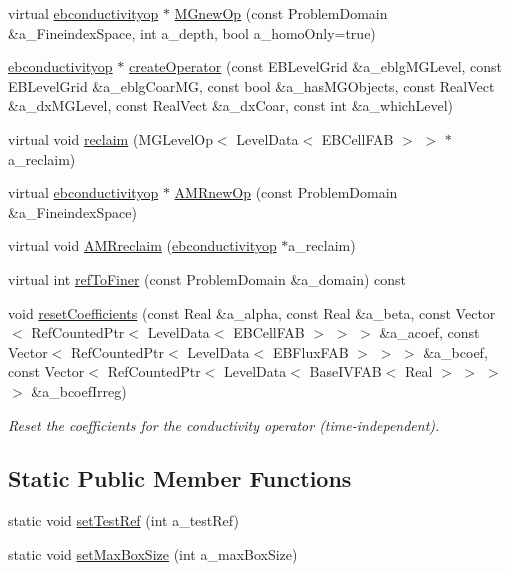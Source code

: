 \begin{DoxyCompactItemize}
\item 
virtual \hyperlink{classebconductivityop}{ebconductivityop} $\ast$ \hyperlink{classebconductivityopfactory_a2f87611c5524f4dd0ee6d693f125d33d}{M\+Gnew\+Op} (const Problem\+Domain \&a\+\_\+\+Fineindex\+Space, int a\+\_\+depth, bool a\+\_\+homo\+Only=true)
\item 
\hyperlink{classebconductivityop}{ebconductivityop} $\ast$ \hyperlink{classebconductivityopfactory_a705a3b0bbaa846e7ca7a199a016bf245}{create\+Operator} (const E\+B\+Level\+Grid \&a\+\_\+eblg\+M\+G\+Level, const E\+B\+Level\+Grid \&a\+\_\+eblg\+Coar\+MG, const bool \&a\+\_\+has\+M\+G\+Objects, const Real\+Vect \&a\+\_\+dx\+M\+G\+Level, const Real\+Vect \&a\+\_\+dx\+Coar, const int \&a\+\_\+which\+Level)
\item 
virtual void \hyperlink{classebconductivityopfactory_a0e98d91e4c39fdd82947a9ebffaea6f6}{reclaim} (M\+G\+Level\+Op$<$ Level\+Data$<$ E\+B\+Cell\+F\+AB $>$ $>$ $\ast$a\+\_\+reclaim)
\item 
virtual \hyperlink{classebconductivityop}{ebconductivityop} $\ast$ \hyperlink{classebconductivityopfactory_a2e7ceeb14a059d9f779ffe66a75c5b4e}{A\+M\+Rnew\+Op} (const Problem\+Domain \&a\+\_\+\+Fineindex\+Space)
\item 
virtual void \hyperlink{classebconductivityopfactory_a9a016c0b1c409d899d5d033aca0ab636}{A\+M\+Rreclaim} (\hyperlink{classebconductivityop}{ebconductivityop} $\ast$a\+\_\+reclaim)
\item 
virtual int \hyperlink{classebconductivityopfactory_a40a2eaf9ccf73ef1fa0c2570e43c181c}{ref\+To\+Finer} (const Problem\+Domain \&a\+\_\+domain) const 
\item 
void \hyperlink{classebconductivityopfactory_a3a4a129fc39c5c8bde6f48c469983864}{reset\+Coefficients} (const Real \&a\+\_\+alpha, const Real \&a\+\_\+beta, const Vector$<$ Ref\+Counted\+Ptr$<$ Level\+Data$<$ E\+B\+Cell\+F\+AB $>$ $>$ $>$ \&a\+\_\+acoef, const Vector$<$ Ref\+Counted\+Ptr$<$ Level\+Data$<$ E\+B\+Flux\+F\+AB $>$ $>$ $>$ \&a\+\_\+bcoef, const Vector$<$ Ref\+Counted\+Ptr$<$ Level\+Data$<$ Base\+I\+V\+F\+AB$<$ Real $>$ $>$ $>$ $>$ \&a\+\_\+bcoef\+Irreg)
\begin{DoxyCompactList}\small\item\em Reset the coefficients for the conductivity operator (time-\/independent). \end{DoxyCompactList}\end{DoxyCompactItemize}
\subsection*{Static Public Member Functions}
\begin{DoxyCompactItemize}
\item 
static void \hyperlink{classebconductivityopfactory_a4f8108fd7b218196ea34e4d59f58a0fb}{set\+Test\+Ref} (int a\+\_\+test\+Ref)
\item 
static void \hyperlink{classebconductivityopfactory_a119ddf8e4ae4b096e124d83a178b2102}{set\+Max\+Box\+Size} (int a\+\_\+max\+Box\+Size)
\end{DoxyCompactItemize}
